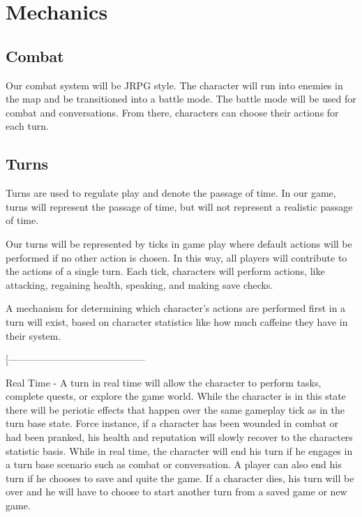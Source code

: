 \documentclass[9pt]{article}
\author{Tessa Saul, Tyler Wittreich}
\begin{document}
\section*{Mechanics}

\subsection*{Combat}
Our combat system will be JRPG style. 
The character will run into enemies in the map and be transitioned
 into a battle mode. The battle mode will be used for combat and 
 conversations. From there, characters can choose their actions for each 
 turn. 
 
 
 
 
 
 
 

\subsection*{Turns}

Turns are used to regulate play and denote the passage of time. 
In our game, turns will represent the passage of time, but will 
not represent a realistic passage of time. 

Our turns will be represented by ticks in game play where default
actions will be performed if no other action is chosen. 
In this way, all players will contribute to the actions of a single 
turn. Each tick, characters will perform actions, like attacking,
regaining health, speaking, and making save checks. 

A mechanism for determining which character's actions are performed
first in a turn will exist, based on character statistics like how much
caffeine they have in their system. 


\smallskip
[------------------------------------------

Real Time - 
A turn in real time will allow the character to perform tasks, complete quests, or explore the game world. While the character is in this state there will be periotic effects that happen over the same gameplay tick as in the turn base state. Force instance, if a character has been wounded in combat or had been pranked, his health and reputation will slowly recover to the characters statistic basis. While in real time, the character will end his turn if he engages in a turn base scenario such as combat or conversation. A player can also end his turn if he chooses to save and quite the game. If a character dies, his turn will be over and he will have to choose to start another turn from a saved game or new game. 
\end{document}
